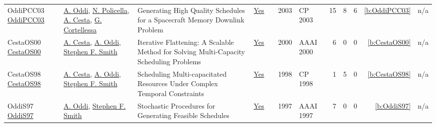 {\begin{longtable}{>{\raggedright\arraybackslash}p{3cm}>{\raggedright\arraybackslash}p{6cm}>{\raggedright\arraybackslash}p{6.5cm}rrrp{2.5cm}rrrrr}
OddiPCC03 \href{https://doi.org/10.1007/978-3-540-45193-8_39}{OddiPCC03} & \hyperref[auth:a284]{A. Oddi}, \hyperref[auth:a285]{N. Policella}, \hyperref[auth:a286]{A. Cesta}, \hyperref[auth:a287]{G. Cortellessa} & Generating High Quality Schedules for a Spacecraft Memory Downlink Problem & \href{../works/OddiPCC03.pdf}{Yes} & \cite{OddiPCC03} & 2003 & CP 2003 & 15 & 8 & 6 & \ref{b:OddiPCC03} & n/a\\
CestaOS00 \href{http://www.aaai.org/Library/AAAI/2000/aaai00-114.php}{CestaOS00} & \hyperref[auth:a286]{A. Cesta}, \hyperref[auth:a284]{A. Oddi}, \hyperref[auth:a300]{Stephen F. Smith} & Iterative Flattening: {A} Scalable Method for Solving Multi-Capacity Scheduling Problems & \href{../works/CestaOS00.pdf}{Yes} & \cite{CestaOS00} & 2000 & AAAI 2000 & 6 & 0 & 0 & \ref{b:CestaOS00} & n/a\\
CestaOS98 \href{https://doi.org/10.1007/3-540-49481-2_36}{CestaOS98} & \hyperref[auth:a286]{A. Cesta}, \hyperref[auth:a284]{A. Oddi}, \hyperref[auth:a300]{Stephen F. Smith} & Scheduling Multi-capacitated Resources Under Complex Temporal Constraints & \href{../works/CestaOS98.pdf}{Yes} & \cite{CestaOS98} & 1998 & CP 1998 & 1 & 5 & 0 & \ref{b:CestaOS98} & n/a\\
OddiS97 \href{http://www.aaai.org/Library/AAAI/1997/aaai97-048.php}{OddiS97} & \hyperref[auth:a284]{A. Oddi}, \hyperref[auth:a300]{Stephen F. Smith} & Stochastic Procedures for Generating Feasible Schedules & \href{../works/OddiS97.pdf}{Yes} & \cite{OddiS97} & 1997 & AAAI 1997 & 7 & 0 & 0 & \ref{b:OddiS97} & n/a\\
\end{longtable}
}

\clearpage
